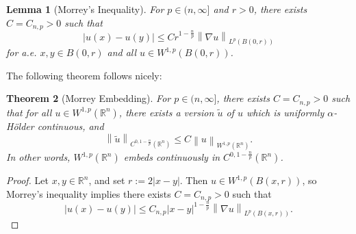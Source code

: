 \documentclass{book}
\newcommand{\bbR}{\mathbb{R}}
\newcommand{\abs}[1]{\left\lvert {#1} \right\rvert}
\newcommand{\norm}[1]{\left\lVert {#1} \right\rVert}
\newtheorem{theorem}{Theorem}[chapter]
\newtheorem{lemma}[theorem]{Lemma}
\theoremstyle{definition}
\numberwithin{equation}{chapter}
\begin{document}
\begin{lemma}[Morrey's Inequality]
    For $p \in (n,\infty]$ and $r > 0$, there exists $C = C_{n,p} > 0$ such that 
    \begin{equation}
        \abs{u(x) - u(y)} \leq Cr^{1 - \frac{n}{p}} \norm{\nabla u}_{L^p(B(0,r))}
    \end{equation}
    for a.e. $x,y \in B(0,r)$ and all $u \in W^{1,p}(B(0,r))$.
\end{lemma}
The following theorem follows nicely:
\begin{theorem}[Morrey Embedding]
    For $p \in (n,\infty]$, there exists $C = C_{n,p} > 0$ such that for all $u \in W^{1,p}(\bbR^n)$, there exists a version $\widetilde{u}$ of $u$ which is uniformly $\alpha$-H\"older continuous, and 
    \begin{equation}
        \norm{\widetilde{u}}_{C^{0,1-\frac{n}{p}}(\bbR^n)} \leq C \norm{u}_{W^{1,p}(\bbR^n)}.
    \end{equation}
    In other words, $W^{1,p}(\bbR^n)$ embeds continuously in $C^{0,1-\frac{n}{p}}(\bbR^n)$.
\end{theorem}
\begin{proof}
    Let $x,y \in \bbR^n$, and set $r := 2\abs{x - y}$. Then $u \in W^{1,p}(B(x,r))$, so Morrey's inequality implies there exists $C = C_{n,p} > 0$ such that 
    \begin{equation}
        \abs{u(x) - u(y)} \leq C_{n,p} \abs{x - y}^{1 - \frac{n}{p}} \norm{\nabla u}_{L^p(B(x,r))}.
    \end{equation}
\end{proof}
\end{document}

